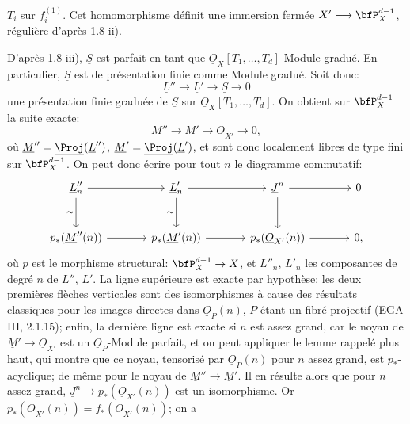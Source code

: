 
\(T_i\) sur \(f_i^{(1)}\). Cet
homomorphisme définit une immersion fermée \(X'\longrightarrow\bfP_X^{d-1}\), régulière d'après 1.8 ii).

D'après 1.8 iii), \(\underline{S}\) est parfait en tant que \(\underline{O}_X[T_1,\ldots,T_d]\)-Module gradué. En particulier, \(\underline{S}\) est de présentation finie comme Module gradué. Soit donc:
\[
\underline{L}''\longrightarrow \underline{L}'\longrightarrow \underline{S}\longrightarrow0
\]
une présentation finie graduée de \(\underline{S}\) sur \(\underline{O}_X[T_1,\ldots,T_d]\). On obtient sur \(\bfP_X^{d-1}\) la suite exacte:
\[
\underline{M}''\longrightarrow \underline{M}'\longrightarrow\underline{O}_{X'}\longrightarrow0,
\]
où \(\underline{M}''=\underline{\Proj}(\underline{L}'')\), \(\underline{M}'=\underline{\Proj}(\underline{L}')\), et sont donc localement libres de type fini sur \(\bfP_X^{d-1}\). On peut donc écrire pour tout \(n\) le diagramme commutatif:
\[
\begin{tikzcd}[column sep=large,row sep=large]
\underline{L}''_n \arrow[r] \arrow[d,"\sim"'] &
\underline{L}'_n \arrow[r] \arrow[d,"\sim"'] &
\underline{J}^n \arrow[r] \arrow[d] &
0\\
p_*(\underline{M}''(n)) \arrow[r] &
p_*(\underline{M}'(n)) \arrow[r] &
p_*(\underline{O}_{X'}(n)) \arrow[r] &
0,
\end{tikzcd}
\]
où \(p\) est le morphisme structural: \(\bfP_X^{d-1}\to X\), et \(\underline{L}''_n\), \(\underline{L}'_n\) les composantes de degré \(n\) de \(\underline{L}''\), \(\underline{L}'\). La ligne supérieure est exacte par hypothèse; les deux premières flèches verticales sont des isomorphismes à cause des résultats classiques pour les images directes dans \(\underline{O}_P(n)\), \(P\) étant un fibré projectif (EGA III, 2.1.15); enfin, la dernière ligne est exacte si \(n\) est assez grand, car le noyau de \(\underline{M}'\to\underline{O}_{X'}\) est un \(\underline{O}_P\)-Module parfait, et on peut appliquer le lemme rappelé plus haut, qui montre que ce noyau, tensorisé par \(\underline{O}_P(n)\) pour \(n\) assez grand, est \(p_*\)-acyclique; de même pour le noyau de \(\underline{M}''\to \underline{M}'\). Il en résulte alors que pour \(n\) assez grand, \(\underline{J}^n\longrightarrow p_*(\underline{O}_{X'}(n))\) est un isomorphisme. Or \(p_*(\underline{O}_{X'}(n))=f_*(\underline{O}_{X'}(n))\); on a

